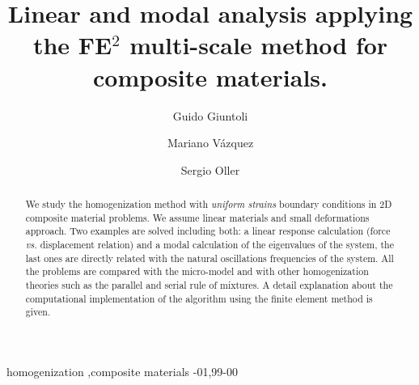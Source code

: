 \documentclass[review]{elsarticle}
\begin{document}
\begin{frontmatter}

\title{Linear and modal analysis applying the FE$^2$ multi-scale method for composite materials.}

\author{Guido Giuntoli}
\address{Carrer Jordi Girona 29, Barcelona}
\author{Mariano V\'azquez}
\address{Carrer Jordi Girona 29, Barcelona}
\author{Sergio Oller}
\address{Carrer Jordi Girona 29, Barcelona}





\begin{abstract}
We study the homogenization method with \emph{uniform strains} boundary
conditions in 2D composite material problems.
We assume linear materials and small deformations approach.
Two examples are solved including both: a linear response calculation (force
\emph{vs.} displacement relation) and a modal calculation of the eigenvalues 
of the system, the last ones are directly related with the natural oscillations 
frequencies of the system.
All the problems are compared with the micro-model and with other homogenization 
theories such as the parallel and serial rule of mixtures.
A detail explanation about the computational implementation of the algorithm using 
the finite element method is given.
\end{abstract}

\begin{keyword}
homogenization \sep composite materials 
-01\sep  99-00
\end{keyword}
 
\end{frontmatter}
\end{document}
